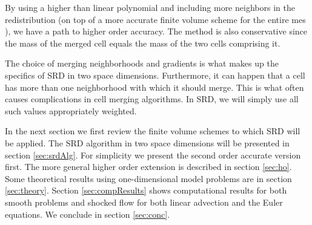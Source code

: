 By using a higher than linear polynomial and
including more neighbors in the
redistribution (on top of a more accurate finite volume scheme for the
entire mes ),
we have a path to higher order accuracy.
The method is also conservative since the mass of the merged cell equals the 
mass of the two cells comprising it.



The choice of merging neighborhoods and gradients is what makes up the
specifics of SRD in two space dimensions. Furthermore, it can happen
that a cell has more than one neighborhood with
which it should merge. This is what often causes complications in cell
merging algorithms. In SRD, we will simply use all such values appropriately
weighted.

In the next section  we first review the finite volume schemes to which SRD will
be applied.
The SRD algorithm in two space dimensions will be presented in section
\ref{sec:srdAlg}.
For simplicity we present the second order accurate version first.
The more general higher order extension is described in 
section \ref{sec:ho}.
Some theoretical results using one-dimensional model problems are in
section \ref{sec:theory}. 
Section \ref{sec:compResults} shows computational results for both smooth
problems and shocked flow for both linear advection and the Euler equations.  We conclude in section \ref{sec:conc}.
